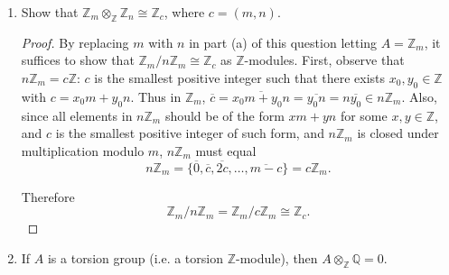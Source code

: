 \documentclass{article}
\begin{document}
\begin{enumerate}[label={(\alph*)}]
\begin{proof}
        Now by $\mathbb{Z}$-bilinear property of tensors, given arbitrary
        $a\in A$ and $z\in\mathbb{Z}_m$,
        \begin{align*}
          &\;(z\cdot a)\otimes\bar{1}\\
          =&\;a\otimes(z\cdot\bar{1})\\
          =&\;a\otimes\bar{z},\\
        \end{align*}
        thus we can simplify the above conditions to get
        \[\sum_{i=1}^n a_i\otimes\overline{z_i} =b\otimes\overline{m}=0,\]
        which implies $x=0$. Thus $\ker(\Phi)=0$.
      \end{proof}

    \item Show that $\mathbb{Z}_m\otimes_\mathbb{Z}\mathbb{Z}_n
      \cong\mathbb{Z}_c$, where $c=(m,n)$.
      \begin{proof}
        By replacing $m$ with $n$ in part (a) of this question letting
        $A=\mathbb{Z}_m$, it suffices to show that
        $\mathbb{Z}_m/n\mathbb{Z}_m\cong \mathbb{Z}_c$ as
        $\mathbb{Z}$-modules. First, observe that
        $n\mathbb{Z}_m=c\mathbb{Z}$: $c$ is the smallest positive integer
        such that there exists $x_0,y_0\in\mathbb{Z}$ with $c=x_0m+y_0n$.
        Thus in $\mathbb{Z}_m$,
        $\overline{c}=\overline{x_0m+y_0n}=\overline{y_0n}=n\overline{y_0}
        \in n\mathbb{Z}_m$. Also, since all elements in $n\mathbb{Z}_m$
        should be of the form $xm+yn$ for some $x,y\in\mathbb{Z}$, and $c$
        is the smallest positive integer of such form, and $n\mathbb{Z}_m$
        is closed under multiplication modulo $m$, $n\mathbb{Z}_m$ must
        equal
        \[n\mathbb{Z}_m =\{\overline{0}, \overline{c},
        \overline{2c}, \ldots, \overline{m-c}\}=c\mathbb{Z}_m.\]

        Therefore
        \[\mathbb{Z}_m/n\mathbb{Z}_m =\mathbb{Z}_m/c\mathbb{Z}_m
        \cong\mathbb{Z}_c.\]
      \end{proof}

    \item If $A$ is a torsion group (i.e. a torsion $\mathbb{Z}$-module),
      then $A\otimes_\mathbb{Z}\mathbb{Q}=0$.


\end{enumerate}
\end{document}

